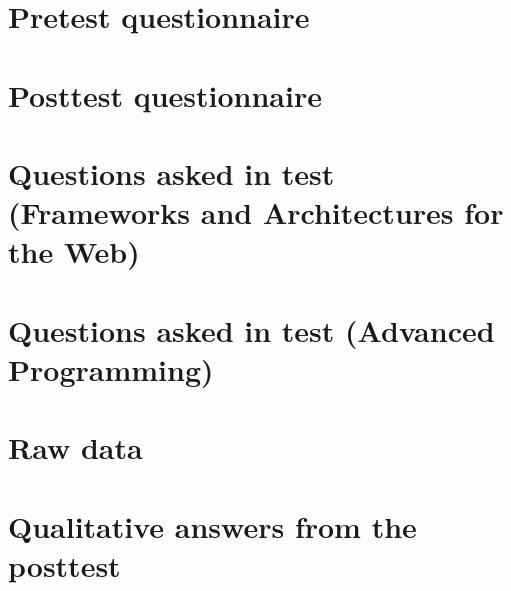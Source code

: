\begin{appendices}

\section{Pretest questionnaire}\label{app:pretest}
 \clearpage


\section{Posttest questionnaire}\label{app:posttest}
 \clearpage


\section{Questions asked in test (Frameworks and Architectures for the Web)}\label{app:questions}
 \clearpage

\section{Questions asked in test (Advanced Programming)}\label{app:questions-advanced}
 \clearpage



\section{Raw data} \label{app:data}

\clearpage

\section{Qualitative answers from the posttest}\label{app:qualitative-answers-posttest}
 \clearpage


\end{appendices}